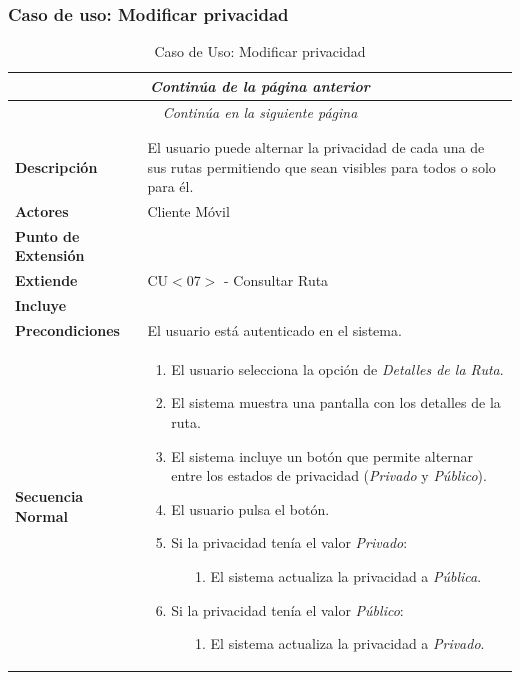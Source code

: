 \subsubsection*{Caso de uso: Modificar privacidad}
\begin{longtable}{| p{4cm} | p{10cm} |}
\endfirsthead
\multicolumn{2}{c}{\textit{Continúa de la página anterior}}\\[12pt]
\hline
\endhead
\hline
\multicolumn{2}{c}{\textit{Continúa en la siguiente página}} \\
\endfoot
\hline
\caption{Caso de Uso: Modificar privacidad}\label{fig:1}\\
\endlastfoot


\hline
\multicolumn{2}{|c|}{\textbf{CU$<$09$>$ - Modificar Privacidad}} \\

\hline
\textbf{Descripción} &
El usuario puede alternar la privacidad de cada una de sus rutas permitiendo que sean visibles para todos o solo para él.\\

\hline
\textbf{Actores} &
Cliente Móvil\\

\hline
\textbf{Punto de Extensión} &
\\

\hline
\textbf{Extiende} &
CU$<$07$>$ - Consultar Ruta
\\

\hline
\textbf{Incluye} &
\\

\hline
\textbf{Precondiciones} &
El usuario está autenticado en el sistema.\\

\hline
\textbf{Secuencia Normal} &\mbox{}\par\vspace{-\baselineskip}
\begin{enumerate}[leftmargin=0.7cm, topsep=0.1cm]
\item El usuario selecciona la opción de \textit{Detalles de la Ruta}.
\item El sistema muestra una pantalla con los detalles de la ruta.
\item El sistema incluye un botón que permite alternar entre los estados de privacidad (\textit{Privado} y \textit{Público}).
\item El usuario pulsa el botón.
\item Si la privacidad tenía el valor \textit{Privado}:
	\begin{itemize}
	\item[1.] El sistema actualiza la privacidad a \textit{Pública}.
	\end{itemize}
\item Si la privacidad tenía el valor \textit{Público}:
	\begin{itemize}
	\item[1.] El sistema actualiza la privacidad a \textit{Privado}.
	\end{itemize}
\end{enumerate}\\


\end{longtable}
